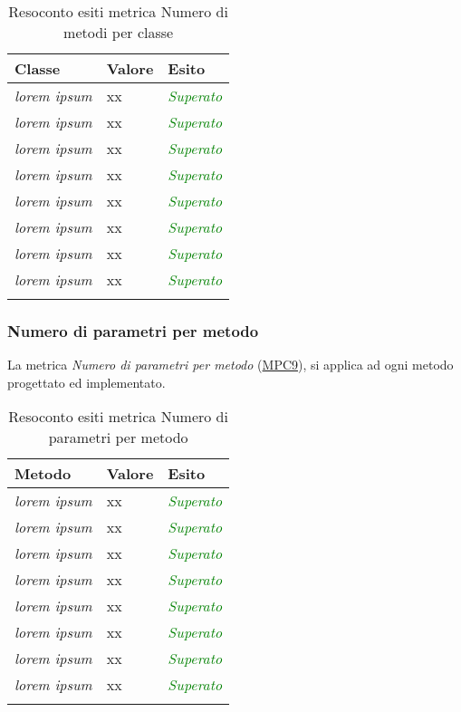 \begin{longtable}{|>{\centering\arraybackslash}p{5cm}|>{\centering\arraybackslash}p{3cm}|>{\centering\arraybackslash}p{3cm}|}
	\hline
	\rowcolor{Gray}
	\textbf{Classe} & \textbf{Valore} & \textbf{Esito} \\
	\hline
	
	\textit{lorem ipsum} & xx & \textcolor{Green}{\textit{Superato}}\\
	\hline
	\textit{lorem ipsum} & xx & \textcolor{Green}{\textit{Superato}}\\
	\hline
	\textit{lorem ipsum} & xx & \textcolor{Green}{\textit{Superato}}\\
	\hline
	\textit{lorem ipsum} & xx & \textcolor{Green}{\textit{Superato}}\\
	\hline
	\textit{lorem ipsum} & xx & \textcolor{Green}{\textit{Superato}}\\
	\hline
	\textit{lorem ipsum} & xx & \textcolor{Green}{\textit{Superato}}\\
	\hline
	\textit{lorem ipsum} & xx & \textcolor{Green}{\textit{Superato}}\\
	\hline
	\textit{lorem ipsum} & xx & \textcolor{Green}{\textit{Superato}}\\
	\hline
	
	\caption{Resoconto esiti metrica Numero di metodi per classe}
\end{longtable}

\subsubsection{Numero di parametri per metodo}
La metrica \textit{Numero di parametri per metodo} (\hyperlink{MPC9}{MPC9}), si applica ad ogni metodo progettato ed implementato.

\begin{longtable}{|>{\centering\arraybackslash}p{5cm}|>{\centering\arraybackslash}p{3cm}|>{\centering\arraybackslash}p{3cm}|}
	\hline
	\rowcolor{Gray}
	\textbf{Metodo} & \textbf{Valore} & \textbf{Esito} \\
	\hline
	
	\textit{lorem ipsum} & xx & \textcolor{Green}{\textit{Superato}}\\
	\hline
	\textit{lorem ipsum} & xx & \textcolor{Green}{\textit{Superato}}\\
	\hline
	\textit{lorem ipsum} & xx & \textcolor{Green}{\textit{Superato}}\\
	\hline
	\textit{lorem ipsum} & xx & \textcolor{Green}{\textit{Superato}}\\
	\hline
	\textit{lorem ipsum} & xx & \textcolor{Green}{\textit{Superato}}\\
	\hline
	\textit{lorem ipsum} & xx & \textcolor{Green}{\textit{Superato}}\\
	\hline
	\textit{lorem ipsum} & xx & \textcolor{Green}{\textit{Superato}}\\
	\hline
	\textit{lorem ipsum} & xx & \textcolor{Green}{\textit{Superato}}\\
	\hline
	
	\caption{Resoconto esiti metrica Numero di parametri per metodo}
\end{longtable}

